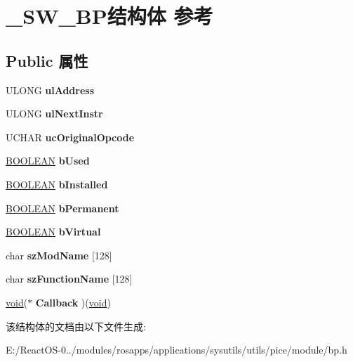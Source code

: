 \hypertarget{struct___s_w___b_p}{}\section{\+\_\+\+S\+W\+\_\+\+B\+P结构体 参考}
\label{struct___s_w___b_p}
\subsection*{Public 属性}
\begin{DoxyCompactItemize}
\item 
\mbox{\label{struct___s_w___b_p_a709fb4a1fbc414383b7e99deb548c500}} 
U\+L\+O\+NG {\bfseries ul\+Address}
\item 
\mbox{\label{struct___s_w___b_p_acbe75861fa7d1c119fa11ab54a38c1e4}} 
U\+L\+O\+NG {\bfseries ul\+Next\+Instr}
\item 
\mbox{\label{struct___s_w___b_p_a024d58495d1e56286b69912e99afcac0}} 
U\+C\+H\+AR {\bfseries uc\+Original\+Opcode}
\item 
\mbox{\label{struct___s_w___b_p_ad3852d5e26713c0a6f7fa7b70d95a99b}} 
\hyperlink{_processor_bind_8h_a112e3146cb38b6ee95e64d85842e380a}{B\+O\+O\+L\+E\+AN} {\bfseries b\+Used}
\item 
\mbox{\label{struct___s_w___b_p_a1066f243cf2e2edaa3bf5acba548502f}} 
\hyperlink{_processor_bind_8h_a112e3146cb38b6ee95e64d85842e380a}{B\+O\+O\+L\+E\+AN} {\bfseries b\+Installed}
\item 
\mbox{\label{struct___s_w___b_p_a5830ae5c02db6811b6eaf0139fc4e34a}} 
\hyperlink{_processor_bind_8h_a112e3146cb38b6ee95e64d85842e380a}{B\+O\+O\+L\+E\+AN} {\bfseries b\+Permanent}
\item 
\mbox{\label{struct___s_w___b_p_a4259548ed20b08fa3a6189cebe6c21e1}} 
\hyperlink{_processor_bind_8h_a112e3146cb38b6ee95e64d85842e380a}{B\+O\+O\+L\+E\+AN} {\bfseries b\+Virtual}
\item 
\mbox{\label{struct___s_w___b_p_a90ac01488e0c0e5a2dfe80307f87df3b}} 
char {\bfseries sz\+Mod\+Name} \mbox{[}128\mbox{]}
\item 
\mbox{\label{struct___s_w___b_p_af14b19bde1c6271fe3b6feeed2dd9377}} 
char {\bfseries sz\+Function\+Name} \mbox{[}128\mbox{]}
\item 
\mbox{\label{struct___s_w___b_p_ab93ee5164a99b0b2867e224772b81f74}} 
\hyperlink{interfacevoid}{void}($\ast$ {\bfseries Callback} )(\hyperlink{interfacevoid}{void})
\end{DoxyCompactItemize}


该结构体的文档由以下文件生成\+:\begin{DoxyCompactItemize}
\item 
E\+:/\+React\+O\+S-\/0../modules/rosapps/applications/sysutils/utils/pice/module/bp.\+h\end{DoxyCompactItemize}
